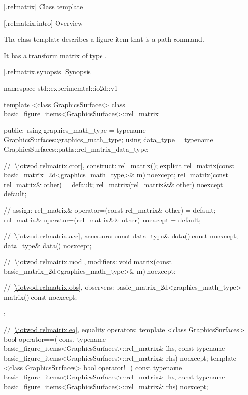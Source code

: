  [\iotwod.relmatrix] {Class template }

 [\iotwod.relmatrix.intro] {Overview}

\pnum
{}%
The class template  describes a figure item that is a path command.

\pnum
It has a transform matrix of type .

 [\iotwod.relmatrix.synopsis] {Synopsis}
\begin{codeblock}
namespace std::experimemtal::io2d::v1 {
  template <class GraphicsSurfaces>
  class basic_figure_items<GraphicsSurfaces>::rel_matrix {
  public:
    using graphics_math_type = typename GraphicsSurfaces::graphics_math_type;
    using data_type =
      typename GraphicsSurfaces::paths::rel_matrix_data_type;

    // \ref{\iotwod.relmatrix.ctor}, construct:
    rel_matrix();
    explicit rel_matrix(const basic_matrix_2d<graphics_math_type>& m) noexcept;
    rel_matrix(const rel_matrix& other) = default;
    rel_matrix(rel_matrix&& other) noexcept = default;

    // assign:
    rel_matrix& operator=(const rel_matrix& other) = default;
    rel_matrix& operator=(rel_matrix&& other) noexcept = default;

    // \ref{\iotwod.relmatrix.acc}, accessors:
    const data_type& data() const noexcept;
    data_type& data() noexcept;

    // \ref{\iotwod.relmatrix.mod}, modifiers:
    void matrix(const basic_matrix_2d<graphics_math_type>& m) noexcept;

    // \ref{\iotwod.relmatrix.obs}, observers:
    basic_matrix_2d<graphics_math_type> matrix() const noexcept;
  };
  
  // \ref{\iotwod.relmatrix.eq}, equality operators:
  template <class GraphicsSurfaces>
  bool operator==(
    const typename basic_figure_items<GraphicsSurfaces>::rel_matrix& lhs,
    const typename basic_figure_items<GraphicsSurfaces>::rel_matrix& rhs) 
    noexcept;  
  template <class GraphicsSurfaces>
  bool operator!=(
    const typename basic_figure_items<GraphicsSurfaces>::rel_matrix& lhs,
    const typename basic_figure_items<GraphicsSurfaces>::rel_matrix& rhs) 
    noexcept;  
}
\end{codeblock}

